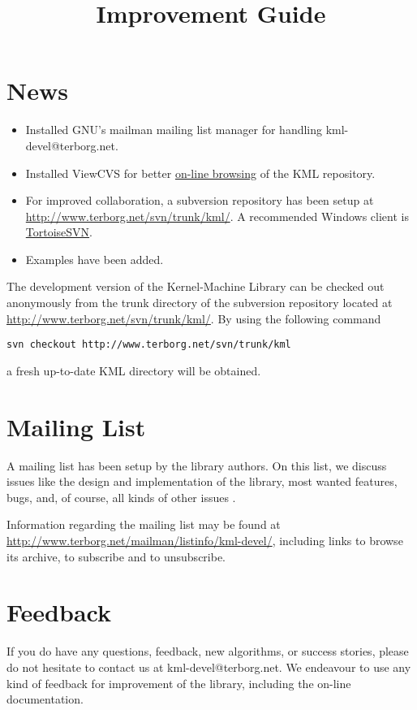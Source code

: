 \documentclass{article}
\begin{document}
\title{Improvement Guide}
\maketitle

\section*{News}

\begin{itemize}

\item Installed GNU's mailman mailing list manager for handling kml-devel@terborg.net.

\item Installed ViewCVS for better 
\href{http://www.terborg.net/cgi-bin/viewcvs.cgi/trunk/kml/}{on-line browsing}
of the KML repository.
\item For improved collaboration, a subversion repository has been 
setup at \href{http://www.terborg.net/svn/trunk/kml/}{http://www.terborg.net/svn/trunk/kml/}. A
recommended Windows client is \href{http://tortoisesvn.tigris.org/}{TortoiseSVN}.
\item Examples have been added.

\end{itemize}


The development version of the Kernel-Machine Library can be checked out anonymously from 
the trunk directory of the subversion repository located at 
\href{http://www.terborg.net/svn/trunk/kml/}{http://www.terborg.net/svn/trunk/kml/}. By using the following command
\begin{verbatim}
svn checkout http://www.terborg.net/svn/trunk/kml
\end{verbatim}
a fresh up-to-date KML directory will be obtained. 

\section*{Mailing List}
A mailing list has been setup by the library authors. 
On this list, we discuss issues like the design and implementation of the library, 
most wanted features, bugs,
and, of course, all kinds of other issues \smile.

Information regarding the mailing list may be found at \href{http://www.terborg.net/mailman/listinfo/kml-devel/}{http://www.terborg.net/mailman/listinfo/kml-devel/},
including links to browse its archive, to subscribe and to unsubscribe. 

\section*{Feedback}

If you do have any questions, feedback, new algorithms, or success stories, 
please do not hesitate to contact us at kml-devel@terborg.net.
We endeavour to use any kind of feedback for improvement of the library, including the
on-line documentation.




\end{document}
